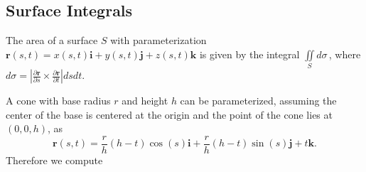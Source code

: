 \subsection{Surface Integrals}

\BEN

\item The area of a surface $S$ with parameterization $\mathbf{r}(s,t) =
x(s,t)\mathbf{i} + y(s,t)\mathbf{j} + z(s,t)\mathbf{k}$ is given by the
integral $\iint\limits_S \! d\sigma \,$, where $d\sigma = |\frac{\partial
\mathbf{r}}{\partial s} \times \frac{\partial \mathbf{r}}{\partial t}| ds dt$.

A cone with base radius $r$ and height $h$ can be parameterized, assuming the
center of the base is centered at the origin and the point of the cone lies at
$(0,0,h)$, as
\[\mathbf{r}(s,t) = \dfrac{r}{h}(h - t)\cos(s)\mathbf{i} + \dfrac{r}{h}(h - t)\sin(s)\mathbf{j} + t\mathbf{k}.\]
Therefore we compute
